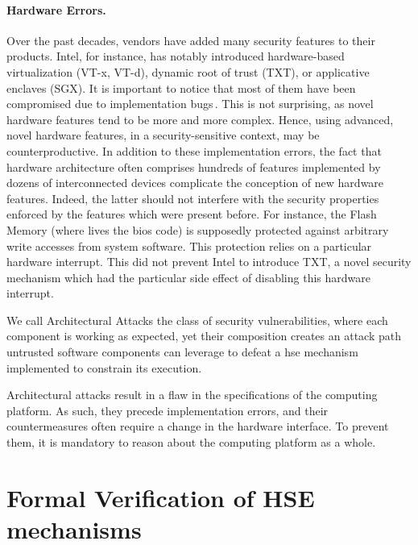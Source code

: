 \paragraph{Hardware Errors.}
%
Over the past decades, vendors have added many security features to their
products.
%
Intel, for instance, has notably introduced hardware-based virtualization (VT-x,
VT-d), dynamic root of trust (TXT), or applicative enclaves (SGX).
%
It is important to notice that most of them have been compromised due to
implementation bugs\,\cite{wojtczuk2011txtbug,sang2010iommu}.
%
This is not surprising, as novel hardware features tend to be more and more
complex.
%
Hence, using advanced, novel hardware features, in a security-sensitive context,
may be counterproductive.
%
In addition to these implementation errors, the fact that hardware architecture
often comprises hundreds of features implemented by dozens of interconnected
devices complicate the conception of new hardware features.
%
Indeed, the latter should not interfere with the security properties enforced by
the features which were present before.
%
For instance, the Flash Memory (where lives the \ac{bios} code) is supposedly
protected against arbitrary write accesses from system software.
%
This protection relies on a particular hardware interrupt.
%
This did not prevent Intel to introduce TXT, a novel security mechanism which
had the particular side effect of disabling this hardware interrupt.

\begin{definition}
  We call Architectural Attacks the class of security vulnerabilities, where
  each component is working as expected, yet their composition creates an attack
  path untrusted software components can leverage to defeat a \ac{hse} mechanism
  implemented to constrain its execution.
\end{definition}

Architectural attacks result in a flaw in the specifications of the computing
platform.
%
As such, they precede implementation errors, and their countermeasures often
require a change in the hardware interface.
%
To prevent them, it is mandatory to reason about the computing platform as a
whole.

\section{Formal Verification of HSE mechanisms}
\label{sec:intro:verif}

